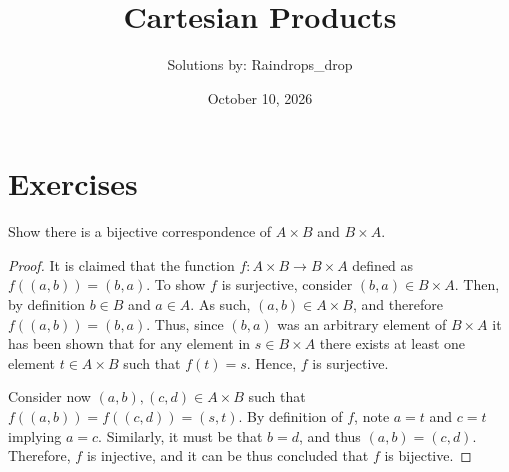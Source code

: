 \documentclass[12pt]{article}
\begin{document}
	\title{Cartesian Products}
	\author{Solutions by: Raindrops\_drop}
	\date{October 10, 2026}
	\maketitle
	
	\section*{Exercises}

	 Show there is a bijective correspondence of $A \times B$ and $B \times A$.
	\begin{proof}
		It is claimed that the function $f: A \times B \to B \times A$
		defined as $f\left( (a,b)\right) = (b, a)$. To show $f$ is surjective,
		consider $(b, a) \in B \times A$. Then, by definition $b \in B$ and 
		$a \in A$. As such, $(a, b) \in A \times B$, and therefore
		$f((a, b)) = (b, a)$. Thus, since $(b, a)$ was an arbitrary element
		of $B \times A$ it has been shown that for any element in 
		$s \in B \times A$ there exists at least one element $ t \in A \times B$
		such that $f(t) = s$. Hence, $f$ is surjective.

		Consider now $(a, b), (c, d) \in A \times B$ such that 
		$f((a, b)) = f((c, d)) = (s, t)$. By definition of $f$, note 
		$a = t$ and $c = t$ implying $a = c$. Similarly, it must be
		that $b = d$, and thus $(a, b) = (c, d)$. Therefore, $f$ is injective,
		and it can be thus concluded that $f$ is bijective. 
	\end{proof}
\end{document}
